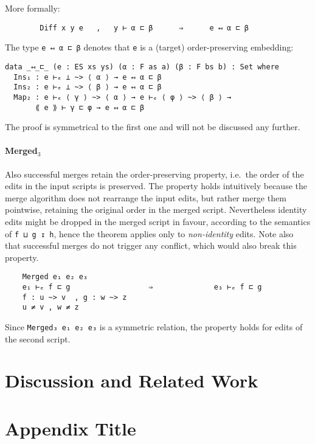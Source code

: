 \documentclass[preprint]{sigplanconf}
\begin{document}
    More formally:
\begin{verbatim}
        Diff x y e   ,   y ⊢ α ⊏ β      ⇒      e ↤ α ⊏ β
\end{verbatim}

    The type \texttt{e ↤ α ⊏ β} denotes that \texttt{e} is a (target) 
    order-preserving embedding:

\begin{verbatim}
data _↤_⊏_ (e : ES xs ys) (α : F as a) (β : F bs b) : Set where
  Ins₁ : e ⊢ₑ ⊥ ~> ⟨ α ⟩ → e ↤ α ⊏ β
  Ins₂ : e ⊢ₑ ⊥ ~> ⟨ β ⟩ → e ↤ α ⊏ β
  Map₂ : e ⊢ₑ ⟨ γ ⟩ ~> ⟨ α ⟩ → e ⊢ₑ ⟨ φ ⟩ ~> ⟨ β ⟩ → 
       ⟪ e ⟫ ⊢ γ ⊏ φ → e ↤ α ⊏ β
\end{verbatim}

    The proof is symmetrical to the first one and will not be discussed any further.

    \paragraph{Merged$_3$}
    Also successful merges retain the order-preserving property, i.e.\
    the order of the edits in the input scripts is preserved.
    The property holds intuitively because the merge algorithm
    does not rearrange the input edits, 
    but rather merge them pointwise, retaining the original order in the merged 
    script.
    Nevertheless identity edits might be dropped in the merged script in favour,
    according to the semantics of \texttt{f ⊔ g ↧ h}, hence
    the theorem applies only to \emph{non-identity} edits.
    Note also that successful merges do not trigger any conflict, which
    would also break this property.

\begin{verbatim}
    Merged e₁ e₂ e₃
    e₁ ⊢ₑ f ⊏ g                  ⇒              e₃ ⊢ₑ f ⊏ g
    f : u ~> v  , g : w ~> z  
    u ≠ v , w ≠ z
\end{verbatim}
    Since \texttt{Merged₃ e₁ e₂ e₃} is a symmetric relation, the property holds 
    for edits of the second script. 

\section{Discussion and Related Work}

\appendix
\section{Appendix Title}
\end{document}
